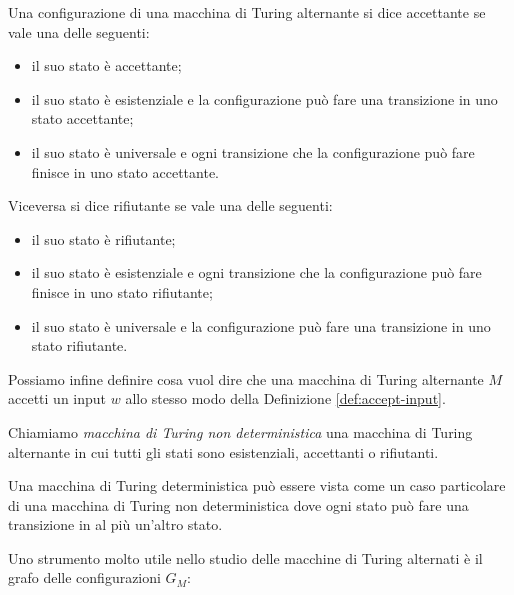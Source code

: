 \begin{definizione}
 Una configurazione di una macchina di Turing alternante si dice accettante se
 vale una delle seguenti:
 \begin{itemize}
  \item il suo stato è accettante;
  \item il suo stato è esistenziale e la configurazione può fare una transizione
  in uno stato accettante;
  \item il suo stato è universale e ogni transizione che la configurazione può fare
  finisce in uno stato accettante.
 \end{itemize}
 Viceversa si dice rifiutante se vale una delle seguenti:
 \begin{itemize}
  \item il suo stato è rifiutante;
  \item il suo stato è esistenziale e ogni transizione che la configurazione può fare
  finisce in uno stato rifiutante;
  \item il suo stato è universale e la configurazione può fare una transizione
  in uno stato rifiutante.
 \end{itemize}
\end{definizione}
Possiamo infine definire cosa vuol dire che una macchina di Turing alternante
$M$ accetti un input $w$ allo stesso modo della Definizione \ref{def:accept-input}.

\begin{definizione}
 Chiamiamo \emph{macchina di Turing non deterministica} una macchina di Turing
 alternante in cui tutti gli stati sono esistenziali, accettanti o rifiutanti.
\end{definizione}

\begin{osservazione}
 Una macchina di Turing deterministica può essere vista come un caso particolare
 di una macchina di Turing non deterministica dove ogni
 stato può fare una transizione in al più un'altro stato.
\end{osservazione}

Uno strumento molto utile nello studio delle macchine di Turing alternati è
il grafo delle configurazioni $G_M$:

